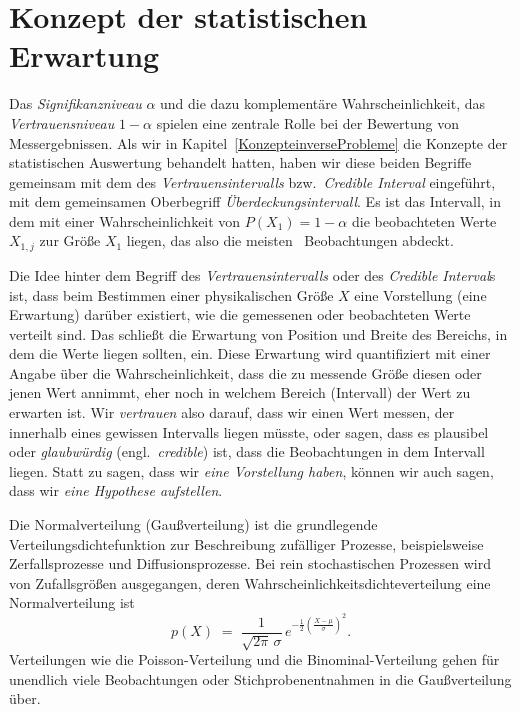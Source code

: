 
\section{Konzept der statistischen Erwartung}

Das \textsl{Signifikanzniveau} $\alpha$ und die dazu komplementäre Wahrscheinlichkeit,
das \textsl{Vertrauensniveau} $1 - \alpha$ spielen eine zentrale Rolle bei der Bewertung
von Messergebnissen. Als wir in Kapitel~\ref{KonzepteinverseProbleme} die Konzepte der statistischen Auswertung
behandelt hatten,
haben wir diese beiden Begriffe gemeinsam mit dem des \textsl{Vertrauensintervalls} bzw.\
\textsl{Credible Interval} eingeführt, mit dem gemeinsamen Oberbegriff \textsl{Überdeckungsintervall}.
Es ist das Intervall, in dem mit einer Wahrscheinlichkeit von $P(X_1) = 1 - \alpha$ die
beobachteten Werte $X_{1,j}$ zur Größe $X_1$ liegen, das also die \glqq meisten\grqq
~Beobachtungen abdeckt.

Die Idee hinter dem Begriff des \textsl{Vertrauensintervalls} oder des \textsl{Credible Interval}s
ist, dass beim Bestimmen einer physikalischen Größe $X$ eine Vorstellung (eine Erwartung) darüber
existiert, wie die gemessenen oder beobachteten Werte verteilt sind. Das schließt die
Erwartung von Position und Breite des Bereichs, in dem die Werte liegen sollten, ein.
Diese Erwartung wird quantifiziert mit einer Angabe über die Wahrscheinlichkeit, dass die
zu messende Größe diesen oder jenen Wert annimmt, eher noch in welchem Bereich (Intervall) der
Wert zu erwarten ist. Wir \textsl{vertrauen} also darauf, dass wir einen Wert messen, der innerhalb eines
gewissen Intervalls liegen müsste, oder sagen, dass es plausibel oder \textsl{glaubwürdig}
(engl.\ \textsl{credible}) ist, dass die Beobachtungen in dem Intervall liegen.
Statt zu sagen, dass wir \textsl{eine Vorstellung haben}, können wir auch sagen,
dass wir \textsl{eine Hypothese aufstellen}.

Die Normalverteilung (Gaußverteilung) ist die grundlegende Verteilungsdichtefunktion
zur Beschreibung zufälliger Prozesse, beispielsweise Zerfallsprozesse und Diffusionsprozesse.
Bei rein stochastischen Prozessen wird von Zufallsgrößen ausgegangen, deren
Wahrscheinlichkeitsdichteverteilung eine Normalverteilung ist
\begin{equation}
p(X) \; = \; \frac{1}{\sqrt{2 \pi} \, \sigma} \, e^{-\frac{1}{2}\left(\frac{X - \mu}{\sigma}\right)^2}.
\end{equation}
Verteilungen wie die Poisson-Verteilung und die Binominal-Verteilung gehen für
unendlich viele Beobachtungen oder Stichprobenentnahmen in die Gaußverteilung über.

